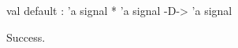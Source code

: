 \runverbatimtrue
{}
\begin{RunVerbatimMsg}
val default : 'a signal * 'a signal -D-> 'a signal
\end{RunVerbatimMsg}
\begin{RunVerbatimErr}
Success.
\end{RunVerbatimErr}
